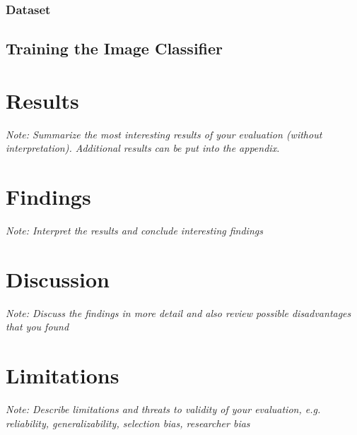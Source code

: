 \subsubsection{Dataset}


\subsection{Training the Image Classifier}


\section{Results}

\textit{Note: Summarize the most interesting results of your evaluation (without interpretation). Additional results can be put into the appendix.}

\section{Findings}

\textit{Note: Interpret the results and conclude interesting findings}

\section{Discussion}

\textit{Note: Discuss the findings in more detail and also review possible disadvantages that you found}

\section{Limitations}

\textit{Note: Describe limitations and threats to validity of your evaluation, e.g. reliability, generalizability, selection bias, researcher bias}